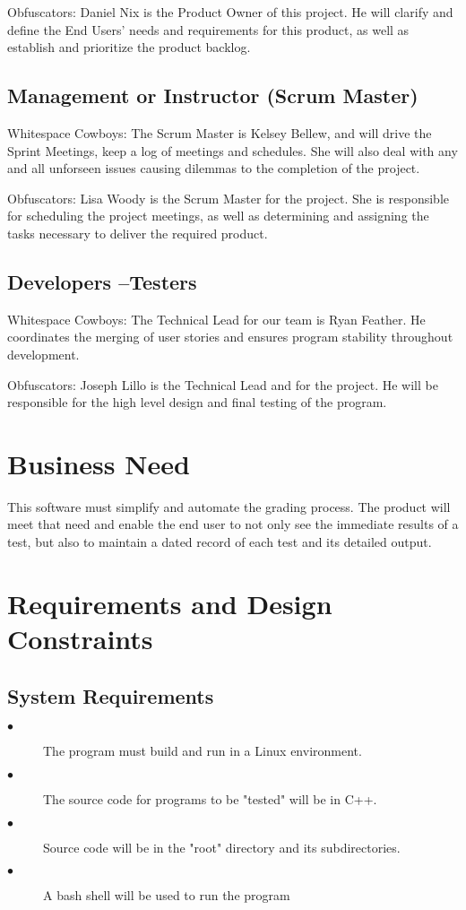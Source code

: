 Obfuscators:
Daniel Nix is the Product Owner of this project.  He will clarify and define the End Users' needs and requirements 
for this product, as well as establish and prioritize the product backlog.

\subsection{Management or Instructor (Scrum Master)}
Whitespace Cowboys:
The Scrum Master is Kelsey Bellew, and will drive the Sprint Meetings, keep a log of
meetings and schedules. She will also deal with any and all unforseen issues causing 
dilemmas to the completion of the project.

Obfuscators:
Lisa Woody is the Scrum Master for the project.  She is responsible for scheduling the project meetings, as well as 
determining and assigning the tasks necessary to deliver the required product.

\subsection{Developers --Testers}
Whitespace Cowboys:
The Technical Lead for our team is Ryan Feather.  He coordinates the merging of user stories and ensures
 program stability throughout development.

Obfuscators:
Joseph Lillo is the Technical Lead and for the project.  He will be responsible for the high level design and final
testing of the program.

\section{Business Need}
This software must simplify and automate the grading process.  The product will meet that need and enable 
the end user to not only see the immediate results of a test, but also to maintain a dated record of each test
and its detailed output.

\section{Requirements and Design Constraints}

\subsection{System  Requirements}
\begin{description}
\item [$\bullet$] The program must build and run in a Linux environment.
\item [$\bullet$] The source code for programs to be "tested" will be in C++.
\item [$\bullet$] Source code will be in the "root" directory and its subdirectories.
\item [$\bullet$] A bash shell will be used to run the program
\end{description}

